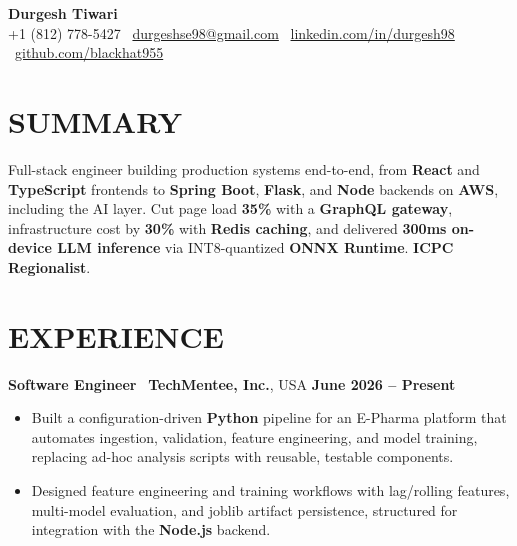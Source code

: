 \documentclass[a4paper,9pt]{extarticle}
\begin{document}
\thispagestyle{empty}
\vspace*{-0.5cm}
\begin{center}
  {\fontsize{22}{24}\selectfont\bfseries Durgesh Tiwari}\\
  \vspace*{0.2em}
  +1 (812) 778-5427 \textbar\
  \href{mailto:durgeshse98@gmail.com}{durgeshse98@gmail.com} \textbar\
  \href{https://linkedin.com/in/durgesh98}{linkedin.com/in/durgesh98} \textbar\
  \href{https://github.com/blackhat955}{github.com/blackhat955}
\end{center}

\section*{SUMMARY}
Full-stack engineer building production systems end-to-end, from \textbf{React} and \textbf{TypeScript} frontends to \textbf{Spring Boot}, \textbf{Flask}, and \textbf{Node} backends on \textbf{AWS}, including the AI layer. Cut page load \textbf{35\%} with a \textbf{GraphQL gateway}, infrastructure cost by \textbf{30\%} with \textbf{Redis caching}, and delivered \textbf{300ms on-device LLM inference} via INT8-quantized \textbf{ONNX Runtime}. \textbf{ICPC Regionalist}.

\section*{EXPERIENCE}
\textbf{Software Engineer} \textbar\ \textbf{TechMentee, Inc.}, USA \hfill \textbf{June 2026 -- Present}
\begin{itemize}
  \item Built a configuration-driven \textbf{Python} pipeline for an E-Pharma platform that automates ingestion, validation, feature engineering, and model training, replacing ad-hoc analysis scripts with reusable, testable components.
  \item Designed feature engineering and training workflows with lag/rolling features, multi-model evaluation, and joblib artifact persistence, structured for integration with the \textbf{Node.js} backend.
\end{itemize}
\end{document}
